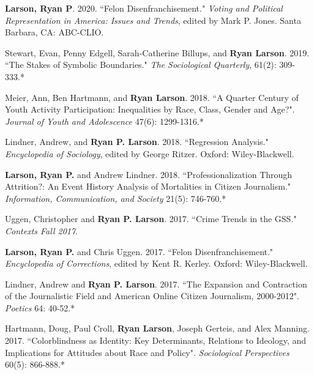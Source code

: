 \documentclass[letterpaper]{article}
\renewenvironment{itemize}{
  \begin{list}{}{
    \setlength{\leftmargin}{1.5em}
  }
}{
  \end{list}
}
\begin{document}
\begin{itemize}
\item \textbf{Larson, Ryan P}. 2020. ``Felon Disenfranchisement." \textit{Voting and Political Representation in America: Issues and Trends}, edited by Mark P. Jones. Santa Barbara, CA: ABC-CLIO.

\item Stewart, Evan, Penny Edgell, Sarah-Catherine Billups, and \textbf{Ryan Larson}. 2019. ``The Stakes of Symbolic Boundaries."  \textit{The Sociological Quarterly}, 61(2): 309-333.*

\item Meier, Ann, Ben Hartmann, and \textbf{Ryan Larson}. 2018.  ``A Quarter Century of Youth Activity Participation: Inequalities by Race, Class, Gender and Age?". \textit{Journal of Youth and Adolescence} 47(6): 1299-1316.*

\item Lindner, Andrew, and \textbf{Ryan P. Larson}. 2018. ``Regression Analysis." \textit{Encyclopedia of Sociology}, edited by George Ritzer. Oxford: Wiley-Blackwell.

\item \textbf{Larson, Ryan P.} and Andrew Lindner. 2018. ``Professionalization Through Attrition?: An Event History Analysis of Mortalities in Citizen Journalism."  \textit{Information, Communication, and Society} 21(5): 746-760.*

\item Uggen, Christopher and \textbf{Ryan P. Larson}. 2017.  ``Crime Trends in the GSS." \textit{Contexts Fall 2017}.

\item \textbf{Larson, Ryan P.} and Chris Uggen. 2017. ``Felon Disenfranchisement." \textit{Encyclopedia of Corrections}, edited by Kent R. Kerley. Oxford: Wiley-Blackwell.

\item Lindner, Andrew and \textbf{Ryan P. Larson}. 2017. ``The Expansion and Contraction of the Journalistic Field and American Online Citizen Journalism, 2000-2012". \textit{Poetics} 64: 40-52.*

\item Hartmann, Doug, Paul Croll, \textbf{Ryan Larson}, Joseph Gerteis, and  Alex Manning. 2017. ``Colorblindness as Identity:  Key Determinants, Relations to Ideology, and Implications for Attitudes about Race and Policy". \textit{Sociological Perspectives} 60(5): 866-888.*


\end{itemize}
\end{document}
